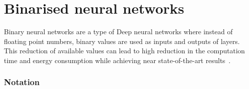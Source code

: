 \chapter{Binarised neural networks}

Binary neural networks are a type of Deep neural networks where instead of floating
point numbers, binary values are used as inputs and outputs of layers.
This reduction of available values can lead to high reduction in the computation
time and energy consumption while achieving near state-of-the-art results~\cite{Hubara2016BinarizedNN}.

\subsection*{Notation}

\begin{table}[h]
    {%
    }%
    \caption{Used notation}%
    \label{table:mat_notation}
\end{table}
